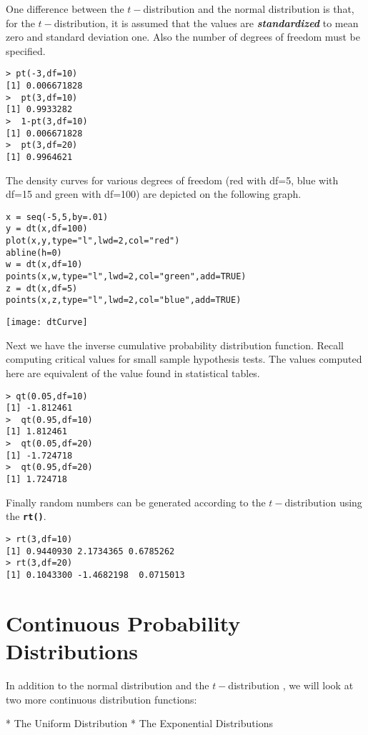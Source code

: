 One difference between the $t-$distribution and the normal distribution is that, for the $t-$distribution, it is assumed that the values are \textit{\textbf{standardized }}to mean zero and standard deviation one.
Also the number of degrees of freedom must be specified. 

\begin{verbatim}
> pt(-3,df=10)
[1] 0.006671828
>  pt(3,df=10)
[1] 0.9933282
>  1-pt(3,df=10)
[1] 0.006671828
>  pt(3,df=20)
[1] 0.9964621
\end{verbatim}
The density curves for various degrees of freedom (red with df=5, blue with df=15 and green with df=100) are depicted on the following graph.
\begin{framed}
\begin{verbatim}
x = seq(-5,5,by=.01)
y = dt(x,df=100) 
plot(x,y,type="l",lwd=2,col="red")
abline(h=0)
w = dt(x,df=10) 
points(x,w,type="l",lwd=2,col="green",add=TRUE)
z = dt(x,df=5) 
points(x,z,type="l",lwd=2,col="blue",add=TRUE)
\end{verbatim}
\end{framed}
 \begin{center}
 \texttt{[image: dtCurve]}
 \end{center}
Next we have the inverse cumulative probability distribution function. Recall computing critical values for small sample hypothesis tests. The values computed here are equivalent of the value found in statistical tables.

\begin{verbatim}
> qt(0.05,df=10)
[1] -1.812461
>  qt(0.95,df=10)
[1] 1.812461
>  qt(0.05,df=20)
[1] -1.724718
>  qt(0.95,df=20)
[1] 1.724718
\end{verbatim}
Finally random numbers can be generated according to the $t-$distribution using the \textbf{\texttt{rt()}}.
\begin{verbatim}
> rt(3,df=10)
[1] 0.9440930 2.1734365 0.6785262
> rt(3,df=20)
[1] 0.1043300 -1.4682198  0.0715013
\end{verbatim}


\newpage
\section{Continuous Probability Distributions}
In addition to the normal distribution and the $t-$distribution , we will look at two more continuous distribution functions: 
\begin{itemize}
*  The Uniform Distribution
*  The Exponential Distributions
\end{itemize}
